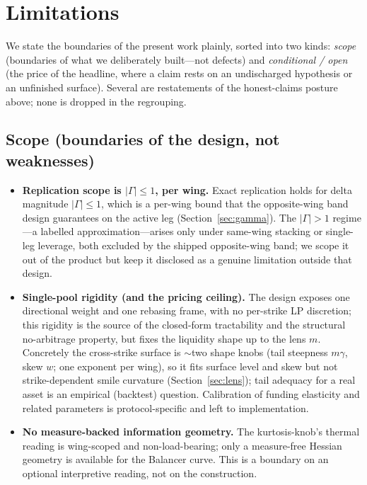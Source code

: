 \documentclass[runningheads]{llncs}
\begin{document}
\section{Limitations}\label{sec:limitations}

We state the boundaries of the present work plainly, sorted into two kinds:
\emph{scope} (boundaries of what we deliberately built---not defects) and
\emph{conditional / open} (the price of the headline, where a claim rests on an
undischarged hypothesis or an unfinished surface). Several are restatements of the
honest-claims posture above; none is dropped in the regrouping.

\subsection{Scope (boundaries of the design, not weaknesses)}
\begin{itemize}[leftmargin=2em]
  \item \textbf{Replication scope is $|\Gamma|\le1$, per wing.} Exact replication
        holds for delta magnitude $|\Gamma|\le1$, which is a per-wing bound that
        the opposite-wing band design guarantees on the active leg
        (Section~\ref{sec:gamma}). The $|\Gamma|>1$ regime---a labelled
        approximation---arises only under same-wing stacking or single-leg
        leverage, both excluded by the shipped opposite-wing band; we scope it out
        of the product but keep it disclosed as a genuine limitation outside that
        design.
  \item \textbf{Single-pool rigidity (and the pricing ceiling).} The design
        exposes one directional weight and one rebasing frame, with no per-strike
        LP discretion; this rigidity is the source of the closed-form tractability
        and the structural no-arbitrage property, but fixes the liquidity shape up
        to the lens $m$. Concretely the cross-strike surface is $\sim$two shape
        knobs (tail steepness $m\gamma$, skew $w$; one exponent per wing), so it
        fits surface level and skew but not strike-dependent smile curvature
        (Section~\ref{sec:lens}); tail adequacy for a real asset is an empirical
        (backtest) question. Calibration of funding elasticity and related
        parameters is protocol-specific and left to implementation.
  \item \textbf{No measure-backed information geometry.} The kurtosis-knob's
        thermal reading is wing-scoped and non-load-bearing; only a measure-free
        Hessian geometry is available for the Balancer curve. This is a boundary on
        an optional interpretive reading, not on the construction.
\end{itemize}
\end{document}
